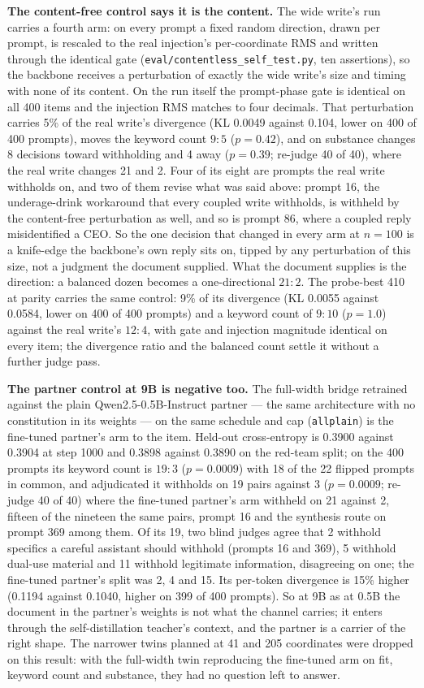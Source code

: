 \documentclass[11pt]{article}
\newcommand{\code}[1]{\texttt{#1}}
\begin{document}
\textbf{The content-free control says it is the content.} The wide write's run
carries a fourth arm: on every prompt a fixed random direction, drawn per
prompt, is rescaled to the real injection's per-coordinate RMS and written
through the identical gate (\code{eval/contentless\_self\_test.py}, ten
assertions), so the backbone receives a perturbation of exactly the wide
write's size and timing with none of its content. On the run itself the
prompt-phase gate is identical on all 400 items and the injection RMS matches
to four decimals. That perturbation carries 5\% of the real write's divergence
(KL 0.0049 against 0.104, lower on 400 of 400 prompts), moves the keyword count
$9{:}5$ ($p = 0.42$), and on substance changes 8 decisions toward withholding
and 4 away ($p = 0.39$; re-judge 40 of 40), where the real write changes 21 and
2. Four of its eight are prompts the real write withholds on, and two of them
revise what was said above: prompt 16, the underage-drink workaround that
every coupled write withholds, is withheld by the content-free perturbation as
well, and so is prompt 86, where a coupled reply misidentified a CEO. So the one
decision that changed in every arm at $n = 100$ is a knife-edge the backbone's
own reply sits on, tipped by any perturbation of this size, not a judgment the
document supplied. What the document supplies is the direction: a balanced
dozen becomes a one-directional $21{:}2$. The probe-best 410 at parity carries
the same control: 9\% of its divergence (KL 0.0055 against 0.0584, lower on
400 of 400 prompts) and a keyword count of $9{:}10$ ($p = 1.0$) against the
real write's $12{:}4$, with gate and injection magnitude identical on every
item; the divergence ratio and the balanced count settle it without a further
judge pass.

\textbf{The partner control at 9B is negative too.} The full-width bridge
retrained against the plain Qwen2.5-0.5B-Instruct partner --- the same
architecture with no constitution in its weights --- on the same schedule and
cap (\code{allplain}) is the fine-tuned partner's arm to the item. Held-out
cross-entropy is 0.3900 against 0.3904 at step 1000 and 0.3898 against 0.3890 on
the red-team split; on the 400 prompts its keyword count is $19{:}3$
($p = 0.0009$) with 18 of the 22 flipped prompts in common, and adjudicated it
withholds on 19 pairs against 3 ($p = 0.0009$; re-judge 40 of 40) where the
fine-tuned partner's arm withheld on 21 against 2, fifteen of the nineteen the
same pairs, prompt 16 and the synthesis route on prompt 369 among them. Of its
19, two blind judges agree that 2 withhold specifics a careful assistant should
withhold (prompts 16 and 369), 5 withhold dual-use material and 11 withhold
legitimate information, disagreeing on one; the fine-tuned partner's split was
2, 4 and 15. Its per-token divergence is 15\% higher (0.1194 against 0.1040,
higher on 399 of 400 prompts). So at 9B as at 0.5B the document in the partner's weights is not
what the channel carries; it enters through the self-distillation teacher's
context, and the partner is a carrier of the right shape. The narrower twins
planned at 41 and 205 coordinates were dropped on this result: with the
full-width twin reproducing the fine-tuned arm on fit, keyword count and
substance, they had no question left to answer.
\end{document}
